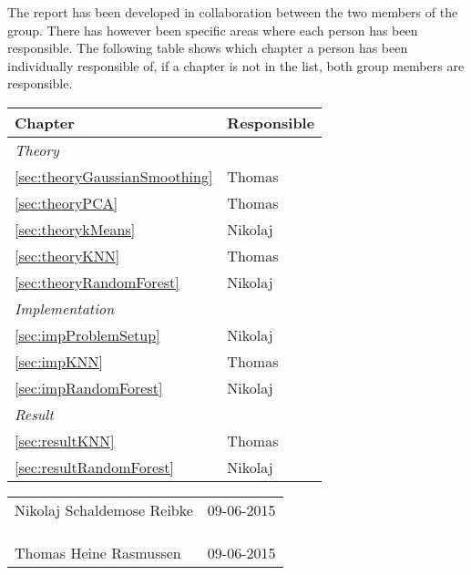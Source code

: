 \documentclass[report]{subfiles}
\begin{document}
The report has been developed in collaboration between the two members of the group. There has however been specific areas where each person has been responsible. The following table shows which chapter a person has been individually responsible of, if a chapter is not in the list, both group members are responsible.\\
	
\begin{tabularx}{\textwidth} {| l | X |}
	\hline
	\textbf{Chapter} & 
	\textbf{Responsible}\\
	\hline
	\textit{Theory}	& \\
		\indent\ref{sec:theoryGaussianSmoothing} \nameref{sec:theoryGaussianSmoothing} & Thomas\\
		\indent\ref{sec:theoryPCA} \nameref{sec:theoryPCA} & Thomas\\
		\indent\ref{sec:theorykMeans} \nameref{sec:theorykMeans} & Nikolaj\\
		\indent\ref{sec:theoryKNN} \nameref{sec:theoryKNN} & Thomas\\
		\indent\ref{sec:theoryRandomForest} \nameref{sec:theoryRandomForest} & Nikolaj\\
	\hline
	\textit{Implementation} & \\
		\indent\ref{sec:impProblemSetup} \nameref{sec:impProblemSetup} & Nikolaj \\
		\indent\ref{sec:impKNN} \nameref{sec:impKNN} & Thomas \\
		\indent\ref{sec:impRandomForest} \nameref{sec:impRandomForest} & Nikolaj \\
	\hline
	\textit{Result} & \\
		\indent\ref{sec:resultKNN} \nameref{sec:resultKNN} & Thomas \\
		\indent\ref{sec:resultRandomForest} \nameref{sec:resultRandomForest} & Nikolaj \\
	\hline
\end{tabularx}

\vfill
\begin{tabularx}{\textwidth}{X r}
\hline
Nikolaj Schaldemose Reibke  & 09-06-2015\\
\\
\\
\\
\hline
Thomas Heine Rasmussen		& 09-06-2015
\end{tabularx}
\end{document}
